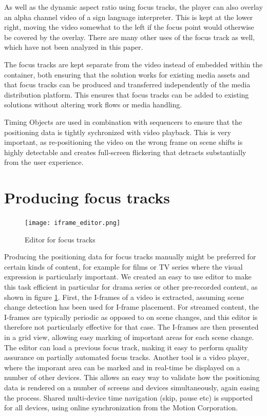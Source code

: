 \documentclass[sigconf, review=true]{acmart}
\begin{document}
As well as the dynamic aspect ratio using focus tracks, the player can also
overlay an alpha channel video of a sign language interpreter. This is kept
at the lower right, moving the video somewhat to the left if the focus point
would otherwise be covered by the overlay. There are many other uses of the
focus track as well, which have not been analyzed in this paper.

The focus tracks are kept separate from the video instead of embedded within
the container, both ensuring that the solution works for existing media
assets and that focus tracks can be produced and transferred independently of
the media distribution platform. This ensures that focus tracks can be added
to existing solutions without altering work flows or media handling.

Timing Objects \cite{Arntzen2018,timingobject} are used in combination with
sequencers \cite{sequencer} to ensure that the positioning data is tightly
sychronized with video playback. This is very important, as re-positioning
the video on the wrong frame on scene shifts is highly detectable and creates
full-screen flickering that detracts substantially from the user experience.


\section{Producing focus tracks}

\begin{figure}
\begin{center}
\texttt{[image: iframe\_editor.png]}
\caption{Editor for focus tracks}
\label{iframe_editor}
\end{center}
\end{figure}

Producing the positioning data for focus tracks manually might be preferred
for certain kinds of content, for example for films or TV series where the
visual expression is particularly important. We created an easy to use editor
to make this task efficient in particular for drama series or other
pre-recorded content, as shown in figure \ref{iframe_editor}. First, the
I-frames of a video is extracted, assuming scene change detection has been
used for I-frame placement. For streamed content, the I-frames are typically
periodic as opposed to on scene changes, and this editor is therefore not
particularly effective for that case. The I-frames are then presented in a
grid view, allowing easy marking of important areas for each scene change.
The editor can load a previous focus track, making it easy to perform quality
assurance on partially automated focus tracks. Another tool is a video
player, where the imporant area can be marked and in real-time be displayed
on a number of other devices. This allows an easy way to validate how the
positioning data is rendered on a number of screens and devices
simultaneously, again easing the process. Shared multi-device time navigation
(skip, pause etc) is supported for all devices, using online synchronization
from the Motion Corporation\cite{inMotion}.
\end{document}
